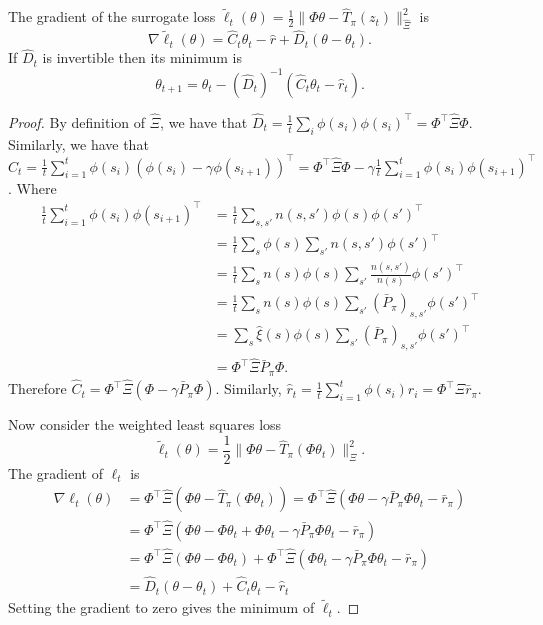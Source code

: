 \documentclass[10pt,a4paper]{amsart}
\begin{document}
\begin{proposition}\label{thm:bert-surr}
    The gradient of the surrogate loss $\tilde{\ell}_t(\theta)= \frac{1}{2}\|\Phi \theta - \hat{T}_{\pi}(z_t)\|^2_{\hat{\Xi}}$ is
    \[
        \nabla \tilde{\ell}_t(\theta) = \hat{C}_t\theta_t -\hat{r} + \hat{D}_t(\theta - \theta_t).
    \]
    If $\hat{D}_t$ is invertible then its minimum is
    \[
        \theta_{t+1} = \theta_t - (\hat{D}_t)^{-1}(\hat{C}_t \theta_t -\hat{r}_t).
    \]
\end{proposition}

\begin{proof}
    By definition of $\hat{\Xi}$, we have that $\hat{D}_t = \frac{1}{t}\sum_i \phi(s_i)\phi(s_i)^\top = \Phi^\top \hat{\Xi} \Phi$.
    Similarly, we have that $\hat{C}_t = \frac{1}{t}\sum_{i=1}^t \phi(s_i)(\phi(s_i) - \gamma \phi(s_{i+1}))^\top = \Phi^\top \hat{\Xi} \Phi - \gamma\frac{1}{t}\sum_{i=1}^t\phi(s_i)\phi(s_{i+1})^\top$.
    Where
    \begin{align}
        \frac{1}{t}\sum_{i=1}^t\phi(s_i)\phi(s_{i+1})^\top &= \frac{1}{t} \sum_{s,s'}n(s,s')\phi(s)\phi(s')^\top\\
        &= \frac{1}{t} \sum_{s}\phi(s)\sum_{s'} n(s,s') \phi(s')^\top\\
        &= \frac{1}{t} \sum_{s}n(s)\phi(s)\sum_{s'} \frac{n(s,s')}{n(s)} \phi(s')^\top\\
        &=  \frac{1}{t} \sum_{s}n(s)\phi(s)\sum_{s'} (\bar{P}_{\pi})_{s,s'}\phi(s')^\top\\
        &= \sum_s \hat{\xi}(s)\phi(s)\sum_{s'} (\bar{P}_{\pi})_{s,s'}\phi(s')^\top\\
        &= \Phi^\top \hat{\Xi}\bar{P}_\pi \Phi. 
    \end{align}
    Therefore $\hat{C}_t = \Phi^\top \hat{\Xi}(\Phi -\gamma \bar{P}_\pi \Phi)$.
    Similarly, $\hat{r}_t = \frac{1}{t}\sum_{i=1}^t \phi(s_i)r_i = \Phi^\top\Xi \bar{r}_\pi$.

    Now consider the weighted least squares loss
    \[
    \tilde{\ell}_t(\theta) = \frac{1}{2}\|\Phi \theta - \hat{T}_\pi(\Phi \theta_t)\|^2_{\hat{\Xi}}.
    \]
    The gradient of $\ell_t$ is
    \begin{align}
    \nabla \ell_t(\theta) &= \Phi^\top\hat{\Xi}(\Phi \theta - \hat{T}_{\pi}(\Phi \theta_t)) = \Phi^\top\hat{\Xi}(\Phi \theta - \gamma \bar{P}_{\pi}\Phi \theta_t  - \bar{r}_\pi)\\
    &=\Phi^\top\hat{\Xi}(\Phi \theta -\Phi \theta_t +\Phi \theta_t - \gamma \bar{P}_{\pi}\Phi \theta_t  - \bar{r}_\pi) \\ 
    &= \Phi^\top\hat{\Xi}(\Phi \theta -\Phi \theta_t) + \Phi^\top\hat{\Xi}(\Phi \theta_t - \gamma \bar{P}_{\pi}\Phi \theta_t  - \bar{r}_\pi)\\
    &= \hat{D}_t(\theta -\theta_t) + \hat{C}_t\theta_t -\hat{r}_t
   \end{align}
Setting the gradient to zero gives the minimum of $\tilde{\ell}_t$. 
\end{proof}
\end{document}
